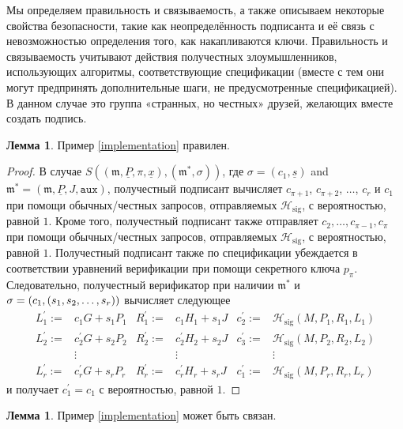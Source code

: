 \documentclass{mrl}
\theoremstyle{definition}
\numberwithin{theorem}{subsection}
\newtheorem{lemma}[theorem]{Лемма}
\begin{document}
Мы определяем правильность и связываемость, а также описываем некоторые свойства безопасности, такие как неопределённость подписанта и её связь с невозможностью определения того, как накапливаются ключи. Правильность и связываемость учитывают действия получестных злоумышленников, использующих алгоритмы, соответствующие спецификации (вместе с тем они могут предпринять дополнительные шаги, не предусмотренные спецификацией). В данном случае это группа «странных, но честных» друзей, желающих вместе создать подпись.

\begin{lemma}\label{correctness}
Пример \ref{implementation} правилен.
\end{lemma}

\begin{proof}

В случае $S((\mathfrak{m}, \underline{P}, \pi, \underline{x}), (\mathfrak{m}^*, \sigma))$, где $\sigma = (c_1, \underline{s})$ and $\mathfrak{m}^* = (\mathfrak{m}, \underline{P}, J, \texttt{aux})$, получестный подписант вычисляет $c_{\pi+1}$, $c_{\pi+2}$, $\ldots$, $c_r$ и $c_1$ при помощи обычных/честных запросов, отправляемых $\mathcal{H}_{\text{sig}}$, с вероятностью, равной $1$. Кроме того, получестный подписант также отправляет $c_2, \ldots, c_{\pi-1}, c_\pi$ при помощи обычных/честных запросов, отправляемых $\mathcal{H}_{\text{sig}}$, с вероятностью, равной $1$. Получестный подписант также по спецификации убеждается в соответствии уравнений верификации при помощи секретного ключа $p_\pi$. Следовательно, получестный верификатор при наличии $\mathfrak{m}^*$ и $\sigma = (c_1, (s_1, s_2, \linebreak \ldots, s_r))$ вычисляет следующее
\begin{align*}
L_1^\prime :=& c_1 G + s_1 P_1 & R_1^\prime :=& c_1 H_1 + s_1 J & c_2^\prime :=& \mathcal{H}_{\text{sig}}(M, P_1, R_1, L_1) \\
L_2^\prime :=& c_2^\prime G + s_2 P_2 & R_2^\prime :=& c_2^\prime H_2 + s_2 J & c_3^\prime :=& \mathcal{H}_{\text{sig}}(M, P_2, R_2, L_2) \\
 & \vdots & & \vdots & & \vdots \\
L_r^\prime :=& c_r^\prime G + s_r P_r & R_r^\prime :=& c_r^\prime H_r + s_r J & c_1^\prime :=& \mathcal{H}_{\text{sig}}(M, P_r, R_r, L_r)
\end{align*}
и получает $c_1^\prime = c_1$ с вероятностью, равной $1$.
\end{proof}

\begin{lemma}
Пример \ref{implementation} может быть связан.
\end{lemma}
\end{document}
